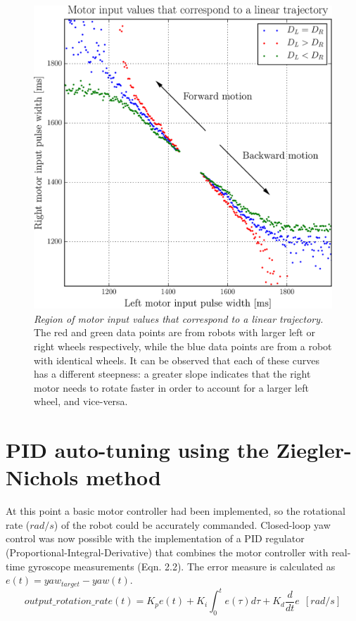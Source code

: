\documentclass[12pt,twoside]{report}
\begin{document}
\begin{figure}[hbtp]
\centerline{
\includegraphics[width=0.7\linewidth]{linear_trajectory_PWM_mapping}}
\caption[Region of motor input values that correspond to a linear trajectory]{\emph{Region of motor input values that correspond to a linear trajectory.}
The red and green data points are from robots with larger left or right wheels respectively, while the blue data points are from a robot with identical wheels. It can be observed that each of these curves has a different steepness: a greater slope indicates that the right motor needs to rotate faster in order to account for a larger left wheel, and vice-versa.
}
\label{fig:linear_trajectory_PWM_mapping}
\end{figure}



\section{PID auto-tuning using the Ziegler-Nichols method} \label{sec:PID_section}


At this point a basic motor controller had been implemented, so the rotational rate ($rad/s$) of the robot could be accurately commanded. Closed-loop yaw control was now possible with the implementation of a PID regulator (Proportional-Integral-Derivative) that combines the  motor controller with real-time gyroscope measurements (Eqn. 2.2). The error measure is calculated as $e(t)=yaw_{target}-yaw(t)$.
\begin{equation}
output\_rotation\_rate(t) = K_p e(t) + K_i \int_{0}^{t}e(\tau)d\tau + K_d \frac{d}{dt}e\ \ [rad/s]
\end{equation}
\end{document}
